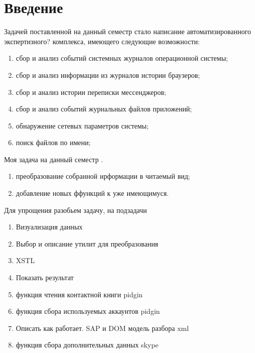 \newpage

\chapter*{Введение}

Задачей поставленной на данный семестр стало написание автоматизированного экспертизного? комплекса, имеющего следующие возможности: \\

\begin{enumerate}
\item сбор и анализ событий системных журналов операционной системы;
\item сбор и анализ информации из журналов истории браузеров;
\item сбор и анализ истории переписки мессенджеров;
\item сбор и анализ событий журнальных файлов приложений;
\item обнаружение сетевых параметров системы;
\item поиск файлов по имени;
\end{enumerate}


Моя задача на данный семестр . \\

\begin{enumerate}
\item преобразование собранной ирформации в читаемый вид;
\item добавление новых ффункций к уже имеющимуся.
\end{enumerate}

Для упрощения разобьем задачу, на подзадачи
\begin{enumerate}
\item Визуализация данных
\item Выбор и описание утилит для преобразования
\item XSTL
\item Показать результат

\item функция чтения контактной книги pidgin
\item функция сбора используемых аккаунтов pidgin
\item Описать как работает. SAP и DOM модель разбора xml
\item функция сбора дополнительных данных skype
\end{enumerate}


